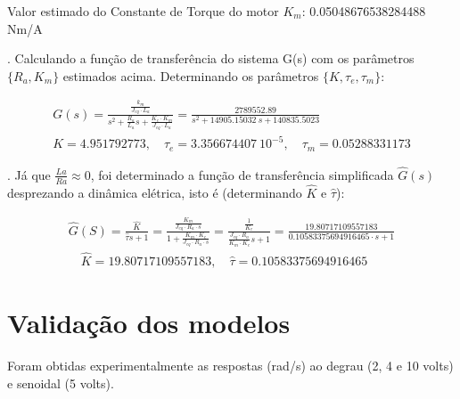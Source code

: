 \documentclass[10pt]{article}
\begin{document}
\quad Valor estimado do Constante de Torque do motor $K_m$: 0.05048676538284488 Nm/A

. Calculando a função de transferência do sistema G(s) com os parâmetros $\{ R_a, K_m \}$
estimados acima. Determinando os parâmetros $\{K,\tau_e, \tau_m\}$:

\begin{equation}
\begin{aligned}
    G(s) = \frac{\frac{k_m}{J_{eq} \cdot L_a}}{s^2 + \frac{R_a}{L_a}s + \frac{K_e \cdot K_m}{J_{eq} \cdot L_a}} = \frac{2789552.89}{s^2 + 14905.15032 \ s + 140835.5023} \\
    K = 4.951792773, \quad \tau_e = 3.356674407 \ 10^{-5}, \quad \tau_m = 0.05288331173 
\end{aligned}
\end{equation}

. Já que $\frac{La}{Ra} \approx 0$, foi determinado a função de transferência simplificada $\hat{G}(s)$ desprezando a dinâmica elétrica, isto é (determinando $\hat{K}$ e $\hat{\tau}$):

\begin{equation}
\begin{aligned}
    \hat{G}(S) = \frac{\hat{K}}{\hat{\tau}s + 1}
    = \frac{\frac{K_m}{J_{eq} \cdot R_a \cdot s}}{1 + \frac{K_m \cdot K_e}{J_{eq} \cdot R_a \cdot s}}
    = \frac{\frac{1}{K_e}}{\frac{J_{eq} \cdot R_a}{K_m \cdot K_e}s + 1}
    = \frac{19.80717109557183}{0.10583375694916465 \cdot s + 1} \\
    \quad \hat{K} = 19.80717109557183,
    \quad \hat{\tau} = 0.10583375694916465 
\end{aligned}
\end{equation}

\section{Validação dos modelos}

\quad Foram obtidas experimentalmente as respostas (rad/s) ao degrau (2, 4 e 10 volts) e
senoidal (5 volts).
\end{document}
